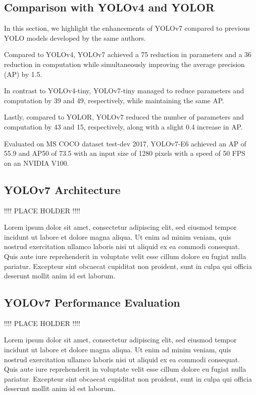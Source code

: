 \documentclass{article}
\begin{document}
\subsection{Comparison with YOLOv4 and YOLOR}

In this section, we highlight the enhancements of YOLOv7 compared to previous YOLO models developed by the same authors.

Compared to YOLOv4, YOLOv7 achieved a 75 reduction in parameters and a 36 reduction in computation while simultaneously improving the average precision (AP) by 1.5.

In contrast to YOLOv4-tiny, YOLOv7-tiny managed to reduce parameters and computation by 39 and 49, respectively, while maintaining the same AP.

Lastly, compared to YOLOR, YOLOv7 reduced the number of parameters and computation by 43 and 15, respectively, along with a slight 0.4 increase in AP.

Evaluated on MS COCO dataset test-dev 2017, YOLOv7-E6 achieved an AP of 55.9 and AP50 of 73.5 with an input size of 1280 pixels with a speed of 50 FPS on an NVIDIA V100.

\subsection{YOLOv7 Architecture}

!!!! PLACE HOLDER !!!!

Lorem ipsum dolor sit amet, consectetur adipiscing elit, sed eiusmod tempor incidunt ut labore et dolore magna aliqua. Ut enim ad minim veniam, quis nostrud exercitation ullamco laboris nisi ut aliquid ex ea commodi consequat. Quis aute iure reprehenderit in voluptate velit esse cillum dolore eu fugiat nulla pariatur. Excepteur sint obcaecat cupiditat non proident, sunt in culpa qui officia deserunt mollit anim id est laborum.

\subsection{YOLOv7 Performance Evaluation}

!!!! PLACE HOLDER !!!!

Lorem ipsum dolor sit amet, consectetur adipiscing elit, sed eiusmod tempor incidunt ut labore et dolore magna aliqua. Ut enim ad minim veniam, quis nostrud exercitation ullamco laboris nisi ut aliquid ex ea commodi consequat. Quis aute iure reprehenderit in voluptate velit esse cillum dolore eu fugiat nulla pariatur. Excepteur sint obcaecat cupiditat non proident, sunt in culpa qui officia deserunt mollit anim id est laborum.
\end{document}
